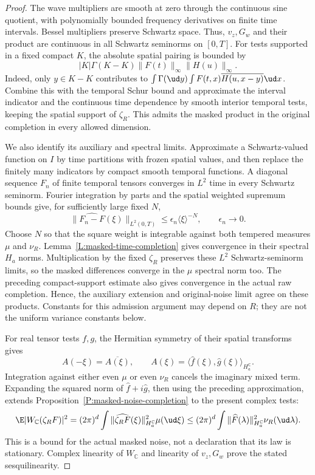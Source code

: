 \begin{proof}
  The wave multipliers are smooth at zero through the continuous sine
  quotient, with polynomially bounded frequency derivatives on finite time
  intervals. Bessel multipliers preserve Schwartz space. Thus, $v_z,G_w$
  and their product are continuous in all Schwartz seminorms on $[0,T]$.
  For tests supported in a fixed compact $K$, the absolute spatial pairing
  is bounded by
  \[
    |K|\Gamma(K-K)\|F(t)\|_\infty\|H(u)\|_\infty.
  \]
  Indeed, only $y \in K-K$ contributes to
  $\int\Gamma(\ud y)\int F(t,x)\overline{H(u,x-y)}\ud x$.
  Combine this with the temporal Schur bound and approximate the interval
  indicator and the continuous time dependence by smooth interior temporal
  tests, keeping the spatial support of $\zeta_R$. This admits the masked
  product in the original completion in every allowed dimension.

  We also identify its auxiliary and spectral limits. Approximate a
  Schwartz-valued function on $I$ by time partitions with frozen spatial
  values, and then replace the finitely many indicators by compact smooth
  temporal functions. A diagonal sequence $F_n$ of finite temporal tensors
  converges in $L^2$ time in every Schwartz seminorm. Fourier integration
  by parts and the spatial weighted supremum bounds give, for sufficiently
  large fixed $N$,
  \[
    \|\widehat{F_n-F}(\xi)\|_{L^2(0,T)}
    \le \epsilon_n\langle\xi\rangle^{-N},\qquad \epsilon_n \to 0.
  \]
  Choose $N$ so that the square weight is integrable against both tempered
  measures $\mu$ and $\nu_R$. Lemma~\ref{L:masked-time-completion} gives
  convergence in their spectral $H_a$ norms. Multiplication by the fixed
  $\zeta_R$ preserves these $L^2$ Schwartz-seminorm limits, so the masked
  differences converge in the $\mu$ spectral norm too. The preceding
  compact-support estimate also gives convergence in the actual raw
  completion. Hence, the auxiliary extension and original-noise limit
  agree on these products. Constants for this admission argument may
  depend on $R$; they are not the uniform variance constants below.

  For real tensor tests $f,g$, the Hermitian symmetry of their spatial
  transforms gives
  \[
    A(-\xi) = \overline{A(\xi)},\qquad
    A(\xi) = \langle\widehat f(\xi),\widehat g(\xi)\rangle_{H_a^{\mathbb C}}.
  \]
  Integration against either even $\mu$ or even $\nu_R$ cancels the
  imaginary mixed term. Expanding the squared norm of
  $\widehat f+i\widehat g$, then using the preceding approximation, extends
  Proposition~\ref{P:masked-noise-completion} to the present complex tests:
  \begin{equation}\label{E:variance-complex-noise}
    \E|W_{\mathbb C}(\zeta_RF)|^2
    = (2\pi)^d\int\|\widehat{\zeta_RF}(\xi)\|_{H_a^{\mathbb C}}^2\mu(\ud\xi)
    \le (2\pi)^d\int\|\widehat F(\lambda)\|_{H_a^{\mathbb C}}^2\nu_R(\ud\lambda).
  \end{equation}
  This is a bound for the actual masked noise, not a declaration that its
  law is stationary. Complex linearity of $W_{\mathbb C}$ and linearity of
  $v_z,G_w$ prove the stated sesquilinearity.


\end{proof}
